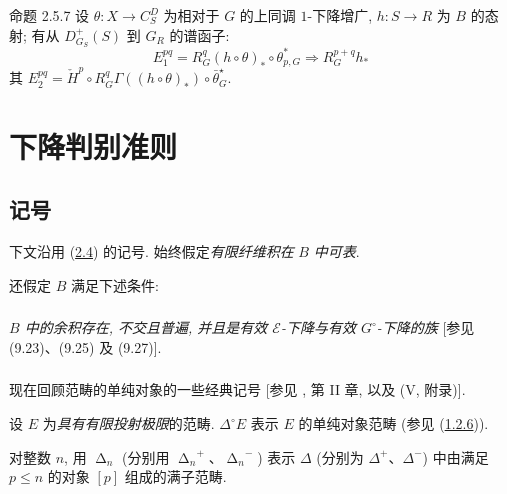 \begin{enonce*}{命题 2.5.7}
设\pageoriginale{} $\theta : X \to C^D_S$ 为相对于 $G$ 的上同调 $1$-下降增广,
$h : S \to R$ 为 $B$ 的态射; 有从 $D^+_{G_S}(S)$ 到 $G_R$ 的谱函子:
$$
E^{pq}_1 = R^q_G(h \circ \theta)_\ast \circ \theta_{p,G}^\ast
\Longrightarrow R^{p + q}_G h_{\ast}
$$
其 $E^{pq}_2 = \check{H}^p \circ R^q_G \Gamma((h \circ \theta)_\ast)\circ \bar\theta_G^{\star}$.
\end{enonce*}



\section{下降判别准则}

\setcounter{subsection}{-1}
\subsection{记号}

下文沿用 (\hyperref[Vbis.subsec2.4]{2.4}) 的记号.
始终假定\emph{有限纤维积在} $B$ \emph{中可表}.

还假定 $B$ 满足下述条件:

\setcounter{subsubsection}{-1}
\subsubsection{}
\emph{$B$ 中的余积存在, 不交且普遍, 并且是有效 $\mathcal{E}$-下降与有效
$G^{\circ}$-下降的族} [参见 \cite{sga4.exp.Vbis.bib.4} (9.23)、(9.25) 及 (9.27)].

\subsubsection{}
现在回顾范畴的单纯对象的一些经典记号
[参见 \cite{sga4.exp.Vbis.bib.3}, 第 II 章, 以及 (V, 附录)].

设 $E$ 为\emph{具有有限投射极限}的范畴.
$\Delta^{\circ}E$ 表示 $E$ 的单纯对象范畴
(参见 (\hyperref[Vbis.subsubsec1.2.6]{1.2.6})).

对整数 $n$, 用 $\mathop{\Delta}_n$
(分别用 ${\mathop{\Delta}_n}^{+}$、${\mathop{\Delta}_n}^{-}$)
表示 $\Delta$ (分别为 $\Delta^+$、$\Delta^-$) 中由满足 $p\leq n$ 的对象 $[p]$ 组成的满子范畴.

